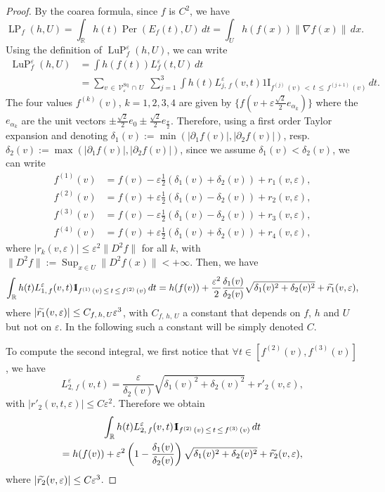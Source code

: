 \documentclass[10pt]{amsart}
\theoremstyle{definition}\newtheorem{defi}[theo]{Definition}\newtheorem{rema}[theo]{Remark}\newtheorem{exam}[theo]{Example}\newtheorem{exem}[theo]{Example}\newtheorem{nota}[theo]{Notation}
\newcommand{\R}{\mathbb{R}}
\newcommand{\ind}{{1\!\!\mathrm{I}}}
\newcommand{\eps}{\varepsilon}
\DeclareMathOperator{\LP}{LP}
\DeclareMathOperator{\LuP}{LuP}
\DeclareMathOperator{\Per}{Per}
\DeclareMathOperator{\Sq}{Sq}
\DeclareMathOperator{\Sup}{Sup}
\newcommand{\calV}{\mathcal{V}}
\let\oldtilde\tilde
\renewcommand*{\tilde}[1]{\mathchoice{\widetilde{#1}}{\widetilde{#1}}{\oldtilde{#1}}{\oldtilde{#1}}}
\let\oldforall\forall
\renewcommand*{\forall}{\mathrel{\oldforall}}
\begin{document}
\begin{proof}
By the coarea formula, since $f$ is $C^2$, we have
\[
\LP_f(h,U) = \int_\R h(t) \Per\left(E_f(t),U\right) \, dt = \int_U h(f(x))
\left\| \nabla f(x) \right\| \, dx.
\]
Using the definition of $\LuP_f^\eps(h,U)$, we can write
\begin{align*}
\LuP_f^\eps(h,U) &= \int h(f(t)) L_f^\eps(t,U) \, dt\\
&=\sum_{v\,\in\,\calV^{\Sq}_\eps\,\cap\,U}\; \sum_{j=1}^3 \int h(t)
L_{j,\,f}^\eps(v,t) \ind_{f^{(j)}\,(v)\,<\,t\,\leq\,f^{(j+1)}\,(v)} \, dt.
\end{align*}
The four values $f^{(k)}(v)$, $k=1,2,3,4$ are given by $\{ f(v +
\eps\tfrac{\sqrt{2}}{2}e_{\alpha_k})\}$ where the $e_{\alpha_k}$ are the unit vectors $\pm \frac{\sqrt{2}}{2} e_0 \pm \frac{\sqrt{2}}{2} e_{\frac{\pi}{2}}$. Therefore, using a first order Taylor expansion and denoting $\delta_1(v):=\min (|\partial_1 f(v)|, |\partial_2 f(v)|)$, resp. $\delta_2(v):=\max(|\partial_1 f(v)|, |\partial_2 f(v)|)$, since we assume $\delta_1(v)<\delta_2(v)$, we can write
\begin{align*}
f^{(1)}(v) &= f(v) - \eps \frac{1}{2}\left(\delta_1(v) + \delta_2(v)\right) + r_1(v,\eps),\\
f^{(2)}(v) &= f(v) + \eps \frac{1}{2}\left(\delta_1(v) - \delta_2(v)\right) + r_2(v,\eps) ,\\
f^{(3)}(v) &= f(v) - \eps \frac{1}{2}\left(\delta_1(v) - \delta_2(v)\right) + r_3(v,\eps),\\
f^{(4)}(v) &= f(v) + \eps \frac{1}{2}\left(\delta_1(v) + \delta_2(v)\right) + r_4(v,\eps),
\end{align*}
where $|r_k(v,\eps)|\leq \eps^2 \|D^2f\|$ for all $k$, with $\|D^2f\|:= \Sup_{x\in U} \| D^2f(x)\| < +\infty $. Then, we have
\[
\int_\R h(t)
L_{1,\,f}^\eps(v,t) \ind_{f^{(1)}\,(v)\,\leq\,t\,\leq\,f^{(2)}\,(v)} \, dt = h(f(v)) + \frac{\eps^2}{2} \frac{\delta_1(v)}{\delta_2(v)}
\sqrt{\delta_1(v)^2 + \delta_2(v)^2 } + \tilde{r_1}(v,\eps),
\]
where
$|\tilde{r_1}(v,\eps)|\leq C_{f,\,h,\,U} \eps^3$, with $C_{f,\,h,\,U}$ a constant that depends on $f$, $h$ and $U$ but not on $\eps$. In the following such a constant will be simply denoted $C$.

To compute the second integral, we first notice that $\forall t\in[f^{(2)}(v),f^{(3)}(v)]$, we have
\[
L_{2,\,f}^\eps(v,t)=
\frac{\eps}{\delta_2(v)} \sqrt{\delta_1(v)^2 + \delta_2(v)^2 } +
r'_2(v,\eps),
\]
with $|r'_2(v,t,\eps)|\leq C\eps^2$. Therefore we
obtain
\begin{multline*}
\int_\R h(t)
L_{2,\,f}^\eps(v,t) \ind_{f^{(2)}\,(v)\,\leq\,t\,\leq\,f^{(3)}\,(v)} \, dt \\
= h(f(v)) + \eps^2 \left(1-\frac{\delta_1(v)}{\delta_2(v)}\right)
\sqrt{\delta_1(v)^2 + \delta_2(v)^2 } + \tilde{r_2}(v,\eps),
\end{multline*}
where
$|\tilde{r_2}(v,\eps)|\leq C \eps^3$.


\end{proof}
\end{document}
